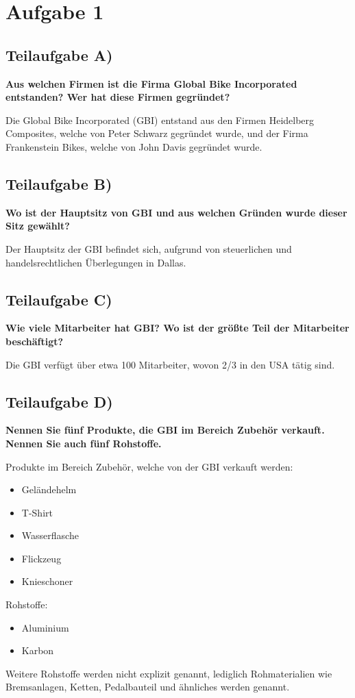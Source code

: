 \section{Aufgabe 1}


\subsection{Teilaufgabe A)}
\textbf{Aus welchen Firmen ist die Firma Global Bike Incorporated entstanden? Wer hat diese
Firmen gegründet?}

\textnormal{Die Global Bike Incorporated (GBI) entstand aus den Firmen
Heidelberg Composites, welche von Peter Schwarz gegründet wurde, und der Firma Frankenstein Bikes, welche von John Davis gegründet wurde.}

\subsection{Teilaufgabe B)}
\textbf{Wo ist der Hauptsitz von GBI und aus welchen Gründen wurde dieser Sitz gewählt?}

\textnormal{Der Hauptsitz der GBI befindet sich, aufgrund von steuerlichen und handelsrechtlichen Überlegungen in Dallas.
}

\subsection{Teilaufgabe C)}
\textbf{Wie viele Mitarbeiter hat GBI? Wo ist der größte Teil der Mitarbeiter beschäftigt?}

\textnormal{Die GBI verfügt über etwa 100 Mitarbeiter, wovon 2/3 in den USA tätig sind.
}

\subsection{Teilaufgabe D)}
\textbf{Nennen Sie fünf Produkte, die GBI im Bereich Zubehör verkauft. Nennen Sie auch fünf
Rohstoffe.}

\textnormal{Produkte im Bereich Zubehör, welche von der GBI verkauft werden:}
\begin{itemize}
  \item Geländehelm
  \item T-Shirt
  \item Wasserflasche
  \item Flickzeug
  \item Knieschoner
\end{itemize}
\textnormal{Rohstoffe:}
\begin{itemize}
  \item Aluminium
  \item Karbon
\end{itemize}
\textnormal{Weitere Rohstoffe werden nicht explizit genannt, lediglich
Rohmaterialien wie Bremsanlagen, Ketten, Pedalbauteil und ähnliches werden genannt.}

